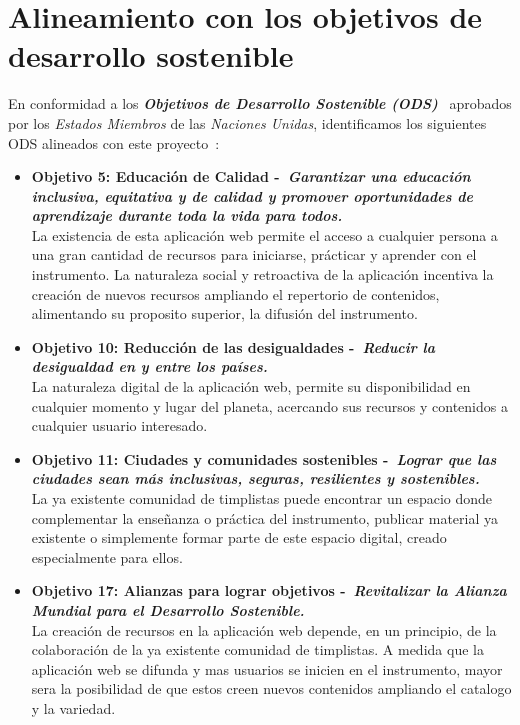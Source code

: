 \section{Alineamiento con los objetivos de desarrollo sostenible}
En conformidad a los \textbf{\emph{Objetivos de Desarrollo Sostenible (ODS)}}~\cite{ODS2023} aprobados por los \emph{Estados Miembros} de las \emph{Naciones Unidas}, identificamos los siguientes ODS alineados con este proyecto~:

\begin{itemize}
    \item \textbf{Objetivo 5: Educación de Calidad -~\emph{Garantizar una educación inclusiva, equitativa y de calidad y promover oportunidades de aprendizaje durante toda la vida para todos.}~\cite{ods_educacion}} \\
    La existencia de esta aplicación web permite el acceso a cualquier persona a una gran cantidad de recursos para iniciarse, prácticar y aprender con el instrumento. La naturaleza social y retroactiva de la aplicación incentiva la creación de nuevos recursos ampliando el repertorio de contenidos, alimentando su proposito superior, la difusión del instrumento.
    
    \item \textbf{Objetivo 10: Reducción de las desigualdades -~\emph{Reducir la desigualdad en y entre los países.}~\cite{ods_desigualdad}} \\
    La naturaleza digital de la aplicación web, permite su disponibilidad en cualquier momento y lugar del planeta, acercando sus recursos y contenidos a cualquier usuario interesado.
    
    \item \textbf{Objetivo 11: Ciudades y comunidades sostenibles -~\emph{Lograr que las ciudades sean más inclusivas, seguras, resilientes y sostenibles.}~\cite{ods_ciudades}} \\
    La ya existente comunidad de timplistas puede encontrar un espacio donde complementar la enseñanza o práctica del instrumento, publicar material ya existente o simplemente formar parte de este espacio digital, creado especialmente para ellos.
    
    \item \textbf{Objetivo 17: Alianzas para lograr objetivos -~\emph{Revitalizar la Alianza Mundial para el Desarrollo Sostenible.}~\cite{ods_asociaciones}} \\
    La creación de recursos en la aplicación web depende, en un principio, de la colaboración de la ya existente comunidad de timplistas. A medida que la aplicación web se difunda y mas usuarios se inicien en el instrumento, mayor sera la posibilidad de que estos creen nuevos contenidos ampliando el catalogo y la variedad.
    
\end{itemize}

